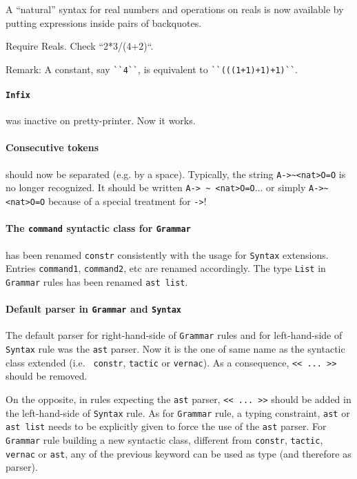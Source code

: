 \documentclass[11pt]{article}
\begin{document}
A ``natural'' syntax for real numbers and operations on reals is now
available by putting expressions inside pairs of backquotes.

\begin{coq_example}
Require Reals.
Check ``2*3/(4+2)``.
\end{coq_example}

Remark: A constant, say \verb:``4``:, is equivalent to
\verb:``(((1+1)+1)+1)``:.

\paragraph{{\tt Infix}} was inactive on pretty-printer. Now it works.

\paragraph{Consecutive tokens} should now be separated (e.g. by a
space). Typically, the string \verb:A->~<nat>O=O: is no longer
recognized. It should be written \verb:A-> ~ <nat>O=O:... or simply
\verb:A->~ <nat>O=O: because of a special treatment for \verb:->:!

\paragraph{The {\tt command} syntactic class for {\tt Grammar}} has
been renamed {\tt constr} consistently with the usage for {\tt Syntax}
extensions. Entries {\tt command1}, {\tt command2}, etc are renamed
accordingly. The type {\tt List} in {\tt Grammar} rules has been
renamed {\tt ast list}.

\paragraph{Default parser in {\tt Grammar} and {\tt Syntax}}
\label{GrammarSyntax}

The default parser for right-hand-side of {\tt Grammar} rules and for
left-hand-side of {\tt Syntax} rule was the {\tt ast} parser.  Now it
is the one of same name as the syntactic class extended (i.e. {\tt
constr}, {\tt tactic} or {\tt vernac}). As a consequence, 
{\verb:<< ... >>:} should be removed.

On the opposite, in rules expecting the {\tt ast} parser,
{\verb:<< ... >>:} should be added in the left-hand-side of {\tt Syntax} rule.
As for {\tt Grammar} rule, a typing constraint, {\tt ast} or {\tt ast
list} needs to be explicitly given to force the use of the {\tt ast}
parser. For {\tt Grammar} rule building a new syntactic class,
different from {\tt constr}, {\tt tactic}, {\tt vernac} or {\tt ast},
any of the previous keyword can be used as type (and therefore as
parser).
\end{document}
